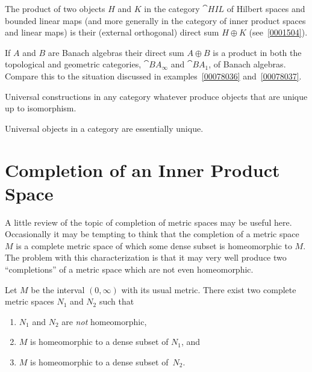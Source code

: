 \begin{exam} The product of two objects $H$ and $K$ in the category $\cat{HIL}$ of
Hilbert spaces and bounded linear maps (and more generally in the category of inner
product spaces and linear maps) is their (external orthogonal) direct sum $H \oplus K$
(see~\ref{0001504}).
\end{exam}


\begin{exam} If $A$ and $B$ are Banach algebras their direct sum $A \oplus B$ is a
product in both the topological and geometric categories, $\cat{BA_\infty}$ and
$\cat{BA_1}$, of Banach algebras.  Compare this to the situation discussed in
examples~\ref{00078036} and~\ref{00078037}.
\end{exam}

Universal constructions in any category whatever produce objects that are unique up to isomorphism.

\begin{prop}\label{C035562} Universal objects in a category are
essentially unique.
\end{prop}















\section{Completion of an Inner Product Space}
A little review of the topic of completion of metric spaces may be useful here.  Occasionally
it may be tempting to think that the completion of a metric space $M$ is a complete metric space
of which some dense subset is homeomorphic to $M$.  The problem with this characterization is that
it may very well produce two ``completions'' of a metric space which are not even homeomorphic.

\begin{exam} Let $M$ be the interval $(0,\infty)$ with its usual metric. There exist two complete
metric spaces $N_1$ and $N_2$ such that
  \begin{enumerate}
    \item $N_1$ and $N_2$ are \emph{not} homeomorphic,
    \item $M$ is homeomorphic to a dense subset of $N_1$, and
    \item $M$ is homeomorphic to a dense subset of~$N_2$.
  \end{enumerate}
\end{exam}

